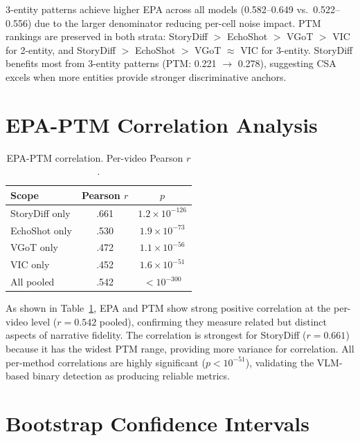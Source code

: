 \documentclass[sigconf,review,anonymous]{acmart}
\begin{document}
3-entity patterns achieve higher EPA across all models (0.582--0.649 vs.\ 0.522--0.556) due to the larger denominator reducing per-cell noise impact.
PTM rankings are preserved in both strata: StoryDiff $>$ EchoShot $>$ VGoT $>$ VIC for 2-entity, and StoryDiff $>$ EchoShot $>$ VGoT $\approx$ VIC for 3-entity.
StoryDiff benefits most from 3-entity patterns (PTM: 0.221 $\to$ 0.278), suggesting CSA excels when more entities provide stronger discriminative anchors.


\section{EPA-PTM Correlation Analysis}
\label{app:correlation}

\begin{table}[H]
\caption{EPA-PTM correlation. Per-video Pearson $r$.}
\label{tab:correlation}
\centering
\small
\begin{tabular}{@{}lcc@{}}
\toprule
Scope & Pearson $r$ & $p$ \\
\midrule
StoryDiff only     & .661 & $1.2 \times 10^{-126}$ \\
EchoShot only   & .530 & $1.9 \times 10^{-73}$ \\
VGoT only   & .472 & $1.1 \times 10^{-56}$ \\
VIC only    & .452 & $1.6 \times 10^{-51}$ \\
All pooled  & .542 & $<10^{-300}$ \\
\bottomrule
\end{tabular}
\end{table}

As shown in Table~\ref{tab:correlation}, EPA and PTM show strong positive correlation at the per-video level ($r = 0.542$ pooled), confirming they measure related but distinct aspects of narrative fidelity.
The correlation is strongest for StoryDiff ($r = 0.661$) because it has the widest PTM range, providing more variance for correlation.
All per-method correlations are highly significant ($p < 10^{-51}$), validating the VLM-based binary detection as producing reliable metrics.


\section{Bootstrap Confidence Intervals}
\label{app:bootstrap}
\end{document}
